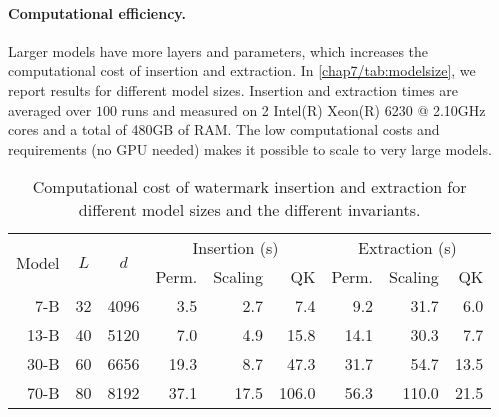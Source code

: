 \paragraph*{Computational efficiency.}
Larger models have more layers and parameters, which increases the computational cost of insertion and extraction.
In \autoref{chap7/tab:modelsize}, we report results for different model sizes.
Insertion and extraction times are averaged over $100$ runs and measured on 2 Intel(R) Xeon(R) 6230 @ 2.10GHz cores and a total of 480GB of RAM.
The low computational costs and requirements (no GPU needed) makes it possible to scale to very large models.



\begin{table}
    \centering
    \caption{
        Computational cost of watermark insertion and extraction for different model sizes and the different invariants. 
    }
    \label{chap7/tab:modelsize}
    \footnotesize
        \begin{tabular}{rcc *{3}{r} *{3}{r}}
            \toprule
            \multirow{2}{*}{Model} & \multirow{2}{*}{$L$} & \multirow{2}{*}{$d$} &  \multicolumn{3}{c}{Insertion (s)} & \multicolumn{3}{c}{Extraction (s)} \\
            & & & Perm. & Scaling & QK   & Perm. & Scaling & QK  \\
             \cmidrule(rr{2pt}){4-6} \cmidrule(rr){7-9}
            7-B & 32 &  4096  & 3.5  & 2.7 &    7.4    &  9.2 &  31.7 &  6.0    \\
            13-B & 40 & 5120  & 7.0  & 4.9 &    15.8   & 14.1 &  30.3 &  7.7    \\
            30-B & 60 & 6656  & 19.3 & 8.7 &    47.3   & 31.7 &  54.7 & 13.5    \\
            70-B & 80 & 8192  & 37.1 & 17.5 &   106.0 &   56.3 & 110.0 & 21.5   \\
            \bottomrule
        \end{tabular}
\end{table}

